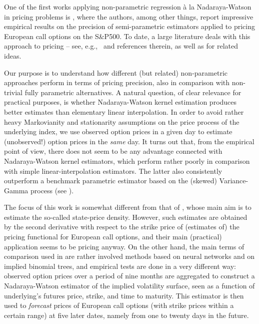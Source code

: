 \documentclass[11pt]{article}
\theoremstyle{remark}
\begin{document}
One of the first works applying non-parametric regression \`a la
Nadaraya-Watson in pricing problems is \cite{AL}, where the authors,
among other things, report impressive empirical results on the
precision of semi-parametric estimators applied to pricing European
call options on the S\&P500. To date, a large literature deals with
this approach to pricing %
-- see, e.g.,~\cite{GHS} and references therein, as
well as \cite{ChernovGhysels:00, RosenbergEngle:02} for related
ideas.

Our purpose is to understand how different (but related)
non-parametric approaches perform in terms of pricing precision, also
in comparison with non-trivial fully parametric alternatives. A
natural question, of clear relevance for practical purposes, is
whether Nadaraya-Watson kernel estimation produces better estimates
than elementary linear interpolation. In order to avoid rather heavy
Markovianity and stationarity assumptions on the price process of the
underlying index, we use observed option prices in a given day to
estimate (unobserved!) option prices in the \emph{same} day. It turns
out that, from the empirical point of view, there does not seem to be
any advantage connected with Nadaraya-Watson kernel estimators, which
perform rather poorly in comparison with simple linear-interpolation
estimators. The latter also consistently outperform a benchmark
parametric estimator based on the (skewed) Variance-Gamma process (see
\cite{MCC}).

The focus of this work is somewhat different from that of \cite{AL},
whose main aim is to estimate the so-called state-price
density. However, such estimates are obtained by the second derivative
with respect to the strike price of (estimates of) the pricing
functional for European call options, and their main (practical)
application seems to be pricing anyway. On the other hand, the main
terms of comparison used in \cite{AL} are rather involved methods
based on neural networks and on implied binomial trees, and empirical
tests are done in a very different way: observed option prices over a
period of nine months are aggregated to construct a Nadaraya-Watson
estimator of the implied volatility surface, seen as a function of
underlying's futures price, strike, and time to maturity. This
estimator is then used to \emph{forecast} prices of European call
options (with strike prices within a certain range) at five later dates,
namely from one to twenty days in the future.
\end{document}
